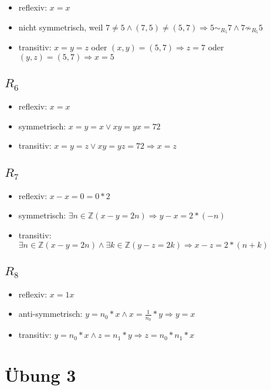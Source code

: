 \documentclass[a4paper,10pt]{article}
\begin{document}
\begin{itemize}
 \item reflexiv: $x = x$
 \item nicht symmetrisch, weil $7 \ne 5 \land (7,5) \ne (5,7) \Rightarrow 5 \sim_{R_5} 7 \land 7 \not\sim_{R_5} 5$
 \item transitiv: $x = y = z$ oder $(x,y) = (5,7) \Rightarrow z = 7$ oder $(y,z) = (5,7) \Rightarrow x = 5$
\end{itemize}

\subsection*{$R_6$}

\begin{itemize}
 \item reflexiv: $x = x$
 \item symmetrisch: $x = y = x \lor xy = yx = 72$
 \item transitiv: $x = y = z \lor xy = yz = 72 \Rightarrow x = z$
\end{itemize}

\subsection*{$R_7$}

\begin{itemize}
 \item reflexiv: $x - x = 0 = 0 * 2$
 \item symmetrisch: $\exists n \in \mathbb{Z} (x - y = 2n) \Rightarrow y - x = 2 * (-n)$
 \item transitiv: $\exists n \in \mathbb{Z} (x - y = 2n) \land \exists k \in \mathbb{Z} (y - z = 2k) \Rightarrow x - z = 2 * (n + k)$
\end{itemize}

\subsection*{$R_8$}

\begin{itemize}
 \item reflexiv: $x = 1x$
 \item anti-symmetrisch: $y = n_0 * x \land x = \frac{1}{n_0} * y \Rightarrow y = x$
 \item transitiv: $y = n_0 * x \land z = n_1 * y \Rightarrow z = n_0 * n_1 * x$
\end{itemize}

\section*{Übung 3}
\end{document}
